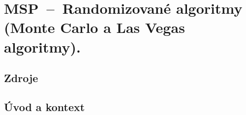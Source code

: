 

\graphicspath{{msp/randomizovane_algoritmy/figures}}


\chapter{MSP~--~Randomizované algoritmy (Monte Carlo a Las Vegas algoritmy).}


\section{Zdroje}

\begin{compactitem}
    \item {}
    \item {}
\end{compactitem}


\section{Úvod a kontext}

